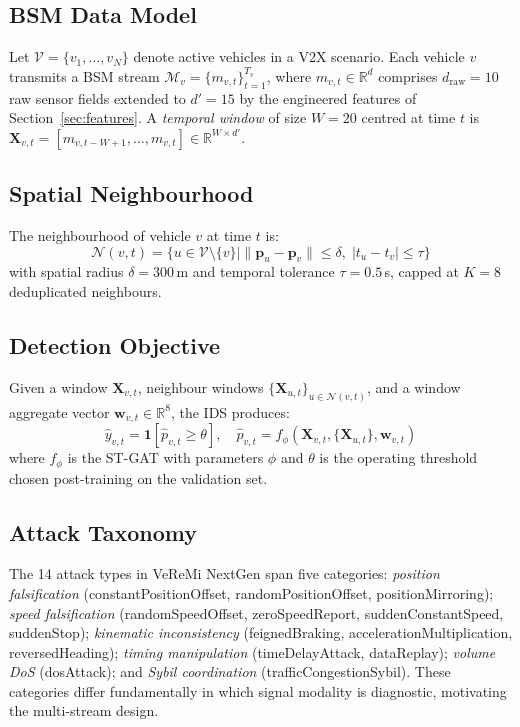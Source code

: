 \documentclass[conference]{IEEEtran}
\begin{document}
\subsection{BSM Data Model}

Let $\mathcal{V} = \{v_1, \ldots, v_N\}$ denote active vehicles in a V2X
scenario.  Each vehicle $v$ transmits a BSM stream
$\mathcal{M}_v = \{m_{v,t}\}_{t=1}^{T_v}$, where
$m_{v,t} \in \mathbb{R}^{d}$ comprises $d_{\text{raw}}=10$ raw sensor
fields extended to $d'=15$ by the engineered features of
Section~\ref{sec:features}.  A \emph{temporal window} of size $W=20$
centred at time $t$ is
$\mathbf{X}_{v,t} = [m_{v,t-W+1}, \ldots, m_{v,t}] \in \mathbb{R}^{W \times d'}$.

\subsection{Spatial Neighbourhood}

The neighbourhood of vehicle $v$ at time $t$ is:
\begin{equation}
\mathcal{N}(v,t) = \bigl\{u \in \mathcal{V} \setminus \{v\} \mid
  \|\mathbf{p}_u - \mathbf{p}_v\| \leq \delta,\;
  |t_u - t_v| \leq \tau \bigr\}
\end{equation}
with spatial radius $\delta=300$\,m and temporal tolerance $\tau=0.5$\,s,
capped at $K=8$ deduplicated neighbours.

\subsection{Detection Objective}

Given a window $\mathbf{X}_{v,t}$, neighbour windows
$\{\mathbf{X}_{u,t}\}_{u \in \mathcal{N}(v,t)}$, and a window aggregate
vector $\mathbf{w}_{v,t} \in \mathbb{R}^8$, the IDS produces:
\begin{equation}
\hat{y}_{v,t} = \mathbf{1}\!\left[\hat{p}_{v,t} \geq \theta\right],
\quad
\hat{p}_{v,t} = f_\phi\!\left(\mathbf{X}_{v,t},
  \{\mathbf{X}_{u,t}\},
  \mathbf{w}_{v,t}\right)
\end{equation}
where $f_\phi$ is the ST-GAT with parameters $\phi$ and $\theta$ is the
operating threshold chosen post-training on the validation set.

\subsection{Attack Taxonomy}

The 14 attack types in VeReMi NextGen span five categories:
\emph{position falsification} (constantPositionOffset,
randomPositionOffset, positionMirroring);
\emph{speed falsification} (randomSpeedOffset, zeroSpeedReport,
suddenConstantSpeed, suddenStop);
\emph{kinematic inconsistency} (feignedBraking,
accelerationMultiplication, reversedHeading);
\emph{timing manipulation} (timeDelayAttack, dataReplay);
\emph{volume DoS} (dosAttack); and
\emph{Sybil coordination} (trafficCongestionSybil).
These categories differ fundamentally in which signal modality is
diagnostic, motivating the multi-stream design.
\end{document}
